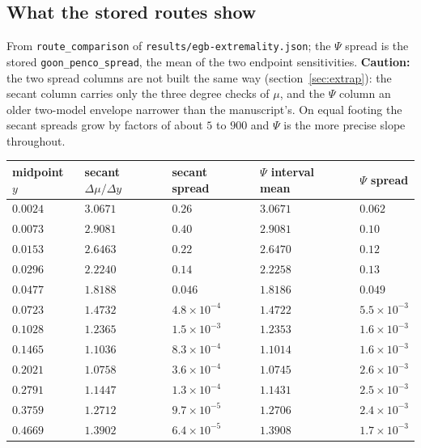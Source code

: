\documentclass[11pt,a4paper]{article}
\newcommand{\q}[1]{\subsection*{\color{accent}#1}}
\begin{document}
\q{What the stored routes show}

From \texttt{route\_comparison} of \texttt{results/egb-extremality.json}; the
$\Psi$ spread is the stored \texttt{goon\_penco\_spread}, the mean of the two
endpoint sensitivities. \textbf{Caution:} the two spread columns are not built
the same way (section~\ref{sec:extrap}): the secant column carries only the
three degree checks of $\mu$, and the $\Psi$ column an older two-model envelope
narrower than the manuscript's. On equal footing the secant spreads grow by
factors of about $5$ to $900$ and $\Psi$ is the more precise slope throughout.

\begin{center}\small
\begin{tabular}{@{}lllll@{}}
\toprule
midpoint $y$ & secant $\Delta\mu/\Delta y$ & secant spread & $\Psi$ interval mean & $\Psi$ spread\\
\midrule
$0.0024$ & $3.0671$ & $0.26$ & $3.0671$ & $0.062$\\
$0.0073$ & $2.9081$ & $0.40$ & $2.9081$ & $0.10$\\
$0.0153$ & $2.6463$ & $0.22$ & $2.6470$ & $0.12$\\
$0.0296$ & $2.2240$ & $0.14$ & $2.2258$ & $0.13$\\
$0.0477$ & $1.8188$ & $0.046$ & $1.8186$ & $0.049$\\
$0.0723$ & $1.4732$ & $4.8\times10^{-4}$ & $1.4722$ & $5.5\times10^{-3}$\\
$0.1028$ & $1.2365$ & $1.5\times10^{-3}$ & $1.2353$ & $1.6\times10^{-3}$\\
$0.1465$ & $1.1036$ & $8.3\times10^{-4}$ & $1.1014$ & $1.6\times10^{-3}$\\
$0.2021$ & $1.0758$ & $3.6\times10^{-4}$ & $1.0745$ & $2.6\times10^{-3}$\\
$0.2791$ & $1.1447$ & $1.3\times10^{-4}$ & $1.1431$ & $2.5\times10^{-3}$\\
$0.3759$ & $1.2712$ & $9.7\times10^{-5}$ & $1.2706$ & $2.4\times10^{-3}$\\
$0.4669$ & $1.3902$ & $6.4\times10^{-5}$ & $1.3908$ & $1.7\times10^{-3}$\\
\bottomrule
\end{tabular}
\end{center}
\end{document}
